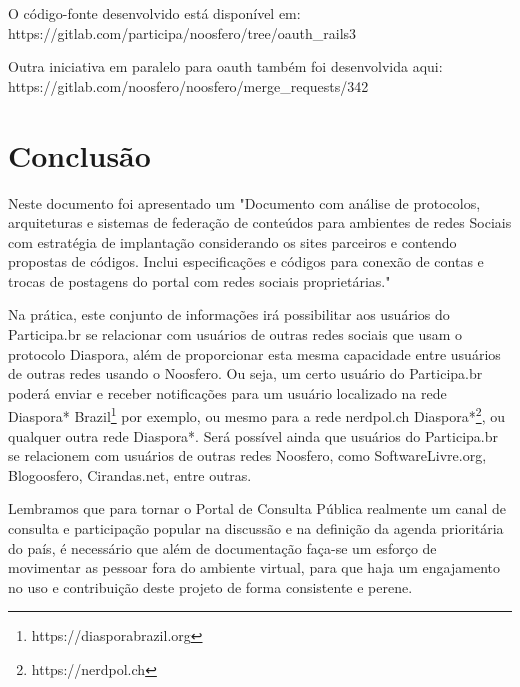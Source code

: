 \documentclass[12pt]{article}
\newcommand{\ProductDescription}{"Documento com análise de protocolos,
  arquiteturas e sistemas de federação de conteúdos para ambientes de redes
  Sociais com estratégia de implantação considerando os sites parceiros e
  contendo propostas de códigos. Inclui especificações e códigos para conexão
  de contas e trocas de postagens do portal com redes sociais proprietárias."
}
\begin{document}
O código-fonte desenvolvido está disponível em:
https://gitlab.com/participa/noosfero/tree/oauth\_rails3

Outra iniciativa em paralelo para oauth também foi desenvolvida aqui:
https://gitlab.com/noosfero/noosfero/merge\_requests/342

\section{Conclusão}

Neste documento foi apresentado um \ProductDescription

Na prática, este conjunto de informações irá possibilitar aos usuários do
Participa.br se relacionar com usuários de outras redes sociais que usam o
protocolo Diaspora, além de proporcionar esta mesma capacidade entre usuários
de outras redes usando o Noosfero. Ou seja, um certo usuário do Participa.br
poderá enviar e receber notificações para um usuário localizado na rede
Diaspora* Brazil\footnote{https://diasporabrazil.org} por exemplo, ou mesmo
para a rede nerdpol.ch Diaspora*\footnote{https://nerdpol.ch}, ou qualquer
outra rede Diaspora*. Será possível ainda que usuários do Participa.br se
relacionem com usuários de outras redes Noosfero, como SoftwareLivre.org,
Blogoosfero, Cirandas.net, entre outras.

Lembramos que para tornar o Portal de Consulta Pública realmente um canal de
consulta e participação popular na discussão e na definição da agenda
prioritária do país, é necessário que além de documentação faça-se um esforço
de movimentar as pessoar fora do ambiente virtual, para que haja um
engajamento no uso e contribuição deste projeto de forma consistente e perene.

\newpage

\newpage
\listoffigures
\newpage
\printindex
\end{document}

